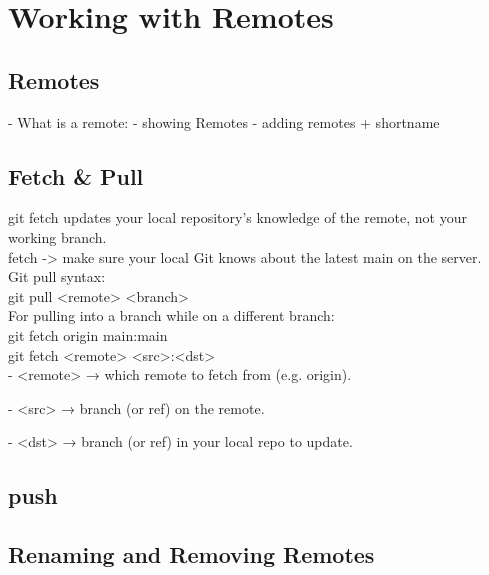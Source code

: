 \chapter{Working with Remotes}
\chapteroverlay

\section{Remotes}
- What is a remote: 
- showing Remotes
- adding remotes + shortname
\section{Fetch \& Pull}
git fetch updates your local repository’s knowledge of the remote, not your working branch.\\
fetch -> make sure your local Git knows about the latest main on the server.\\

Git pull syntax:\\
git pull <remote> <branch>
\\
For pulling into a branch while on a different branch:\\
git fetch origin main:main\\
git fetch <remote> <src>:<dst>\\
- <remote> → which remote to fetch from (e.g. origin).

- <src> → branch (or ref) on the remote.

- <dst> → branch (or ref) in your local repo to update.

\section{push}
\section{Renaming and Removing Remotes}